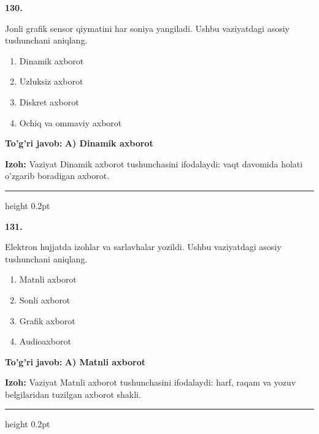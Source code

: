 \documentclass[10pt,a4paper,oneside]{article}
\begin{document}
\noindent\textbf{\color{ink}130.}
\par
Jonli grafik sensor qiymatini har soniya yangiladi. Ushbu vaziyatdagi asosiy tushunchani aniqlang.
\begin{enumerate}[label=\Alph*),leftmargin=9mm]
\item Dinamik axborot
\item Uzluksiz axborot
\item Diskret axborot
\item Ochiq va ommaviy axborot
\end{enumerate}
\begin{tcolorbox}[enhanced,breakable,colback=teal!4,colframe=teal!50!black,boxrule=0.5pt,arc=1.1mm,left=3mm,right=3mm,top=1.7mm,bottom=1.7mm,before skip=2mm,after skip=2mm]
\textbf{\color{teal}To'g'ri javob:} \textbf{A) Dinamik axborot}
\par\smallskip
\textbf{Izoh:} Vaziyat Dinamik axborot tushunchasini ifodalaydi: vaqt davomida holati o'zgarib boradigan axborot.
\end{tcolorbox}
\vspace{2mm}\hrule height 0.2pt \vspace{3mm}

\noindent\textbf{\color{ink}131.}
\par
Elektron hujjatda izohlar va sarlavhalar yozildi. Ushbu vaziyatdagi asosiy tushunchani aniqlang.
\begin{enumerate}[label=\Alph*),leftmargin=9mm]
\item Matnli axborot
\item Sonli axborot
\item Grafik axborot
\item Audioaxborot
\end{enumerate}
\begin{tcolorbox}[enhanced,breakable,colback=teal!4,colframe=teal!50!black,boxrule=0.5pt,arc=1.1mm,left=3mm,right=3mm,top=1.7mm,bottom=1.7mm,before skip=2mm,after skip=2mm]
\textbf{\color{teal}To'g'ri javob:} \textbf{A) Matnli axborot}
\par\smallskip
\textbf{Izoh:} Vaziyat Matnli axborot tushunchasini ifodalaydi: harf, raqam va yozuv belgilaridan tuzilgan axborot shakli.
\end{tcolorbox}
\vspace{2mm}\hrule height 0.2pt \vspace{3mm}
\end{document}
